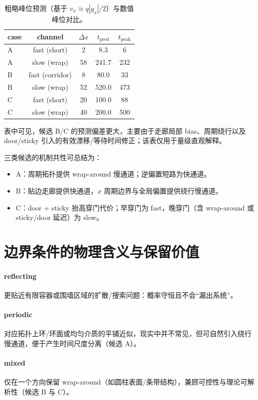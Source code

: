 \documentclass[11pt,fontset=fandol]{ctexart}
\begin{document}
\begin{table}[!htbp]
  \centering
  \begin{tabular}{lcccc}
    \toprule
    case & channel & $\Delta x$ & $t_{\text{pred}}$ & $t_{\text{peak}}$ \\
    \midrule
    A & fast (short) & 2 & 8.3 & 6 \\
    A & slow (wrap) & 58 & 241.7 & 232 \\
    B & fast (corridor) & 8 & 80.0 & 33 \\
    B & slow (wrap) & 52 & 520.0 & 473 \\
    C & fast (short) & 20 & 100.0 & 88 \\
    C & slow (wrap) & 40 & 200.0 & 500 \\
    \bottomrule
  \end{tabular}
  \caption{粗略峰位预测（基于 $v_x \approx q|g_x|/2$）与数值峰位对比。}
  \label{tab:peak-predict}
\end{table}

表中可见，候选 B/C 的预测偏差更大，主要由于走廊局部 bias、周期绕行以及 door/sticky 引入的有效漂移/等待时间修正；该表仅用于量级直观解释。

三类候选的机制共性可总结为：
\begin{itemize}
  \item A：周期拓扑提供 wrap-around 慢通道；逆偏置短路为快通道。
  \item B：贴边走廊提供快通道，$x$ 周期边界与全局偏置提供绕行慢通道。
  \item C：door + sticky 抬高穿门代价；早穿门为 fast，晚穿门（含 wrap-around 或 sticky/door 延迟）为 slow。
\end{itemize}

\section{边界条件的物理含义与保留价值}
\paragraph{reflecting} 更贴近有限容器或围墙区域的扩散/搜索问题：概率守恒且不会“漏出系统”。
\paragraph{periodic} 对应拓扑上环/环面或均匀介质的平铺近似，现实中并不常见，但可自然引入绕行慢通道，便于产生时间尺度分离（候选 A）。
\paragraph{mixed} 仅在一个方向保留 wrap-around（如圆柱表面/条带结构），兼顾可控性与理论可解析性（候选 B 与 C）。
\end{document}
